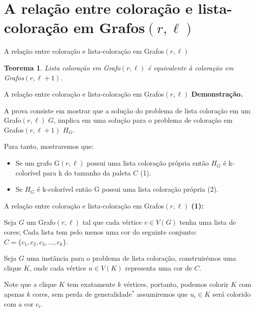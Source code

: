 \documentclass[9pt, compress]{beamer}
\newtheorem{teorema}{Teorema}
\newcommand{\?}{\textcolor{warn}{\textit{?}}}
\begin{document}
    \section{A relação entre coloração e lista-coloração em Grafos$(r,\ell)$}
    \begin{frame}{A relação entre coloração e lista-coloração em Grafos$(r,\ell)$}
        \begin{teorema}
          Lista coloração em Grafo$(r,\ell)$ é equivalente à coloração em Grafos$(r,\ell+1)$. 
        \end{teorema}
    \end{frame}
    \begin{frame}{A relação entre coloração e lista-coloração em Grafos$(r,\ell)$}
        \textbf{Demonstração.}
        
        A prova consiste em mostrar que a solução do problema de lista coloração em um Grafo$(r,\ell)$ $G$, implica em uma solução para o problema de coloração em Grafos$(r,\ell+1)$ $H_G$.
        
        Para tanto, mostraremos que:
          \begin{itemize}
        \item Se um grafo G$(r,\ell)$ possui uma lista coloração própria então $H_G$ é k-colorível para k do tamanho da paleta $C$ (1).
		\item Se $H_G$ é k-colorível então G possui uma lista coloração própria (2).
      \end{itemize}
    \end{frame}
    \begin{frame}{A relação entre coloração e lista-coloração em Grafos$(r,\ell)$}
      \textbf{(1):}
      
      Seja $G$ um Grafo$(r,\ell)$ tal que cada vértice $v \in V(G)$ tenha uma lista de cores; 
      Cada lista tem pelo menos uma cor do seguinte conjunto: $C = \{c_1,c_2,c_3,...,c_k \}$. 
      \begin{center}
        \begin{figure}
        
      \end{figure}
      \end{center}
    \end{frame}
    \begin{frame}
      Seja $G$ uma instância para o problema de lista coloração, construirémos uma clique $K$, onde cada vértice $u \in V(K)$ representa uma cor de $C$.
      \begin{center}
      \begin{figure}
        
      \end{figure}  
      \end{center}
      Note que a clique $K$ tem exatamente $k$ vértices, portanto, podemos colorir $K$ com apenas $k$ cores, sem perda de generalidade$^*$ assumiremos que $u_i \in K$ será colorido com a cor $c_i$.
    \end{frame}
\end{document}
